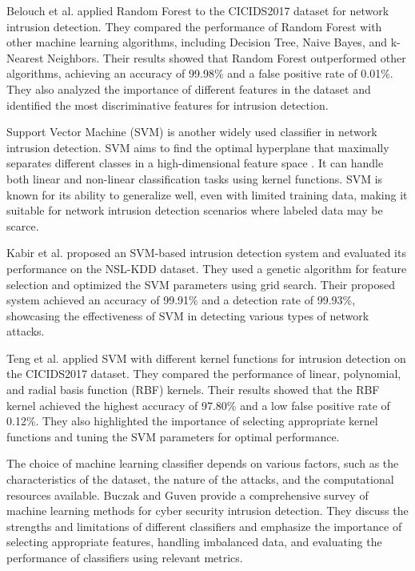 Belouch et al. \cite{belouch2018performance} applied Random Forest to the CICIDS2017 dataset for network intrusion detection. They compared the performance of Random Forest with other machine learning algorithms, including Decision Tree, Naive Bayes, and k-Nearest Neighbors. Their results showed that Random Forest outperformed other algorithms, achieving an accuracy of 99.98\% and a false positive rate of 0.01\%. They also analyzed the importance of different features in the dataset and identified the most discriminative features for intrusion detection.

Support Vector Machine (SVM) is another widely used classifier in network intrusion detection. SVM aims to find the optimal hyperplane that maximally separates different classes in a high-dimensional feature space \cite{cortes1995support}. It can handle both linear and non-linear classification tasks using kernel functions. SVM is known for its ability to generalize well, even with limited training data, making it suitable for network intrusion detection scenarios where labeled data may be scarce.

Kabir et al. \cite{kabir2017network} proposed an SVM-based intrusion detection system and evaluated its performance on the NSL-KDD dataset. They used a genetic algorithm for feature selection and optimized the SVM parameters using grid search. Their proposed system achieved an accuracy of 99.91\% and a detection rate of 99.93\%, showcasing the effectiveness of SVM in detecting various types of network attacks.

Teng et al. \cite{teng2017svm} applied SVM with different kernel functions for intrusion detection on the CICIDS2017 dataset. They compared the performance of linear, polynomial, and radial basis function (RBF) kernels. Their results showed that the RBF kernel achieved the highest accuracy of 97.80\% and a low false positive rate of 0.12\%. They also highlighted the importance of selecting appropriate kernel functions and tuning the SVM parameters for optimal performance.

The choice of machine learning classifier depends on various factors, such as the characteristics of the dataset, the nature of the attacks, and the computational resources available. Buczak and Guven \cite{buczak2015survey} provide a comprehensive survey of machine learning methods for cyber security intrusion detection. They discuss the strengths and limitations of different classifiers and emphasize the importance of selecting appropriate features, handling imbalanced data, and evaluating the performance of classifiers using relevant metrics.

